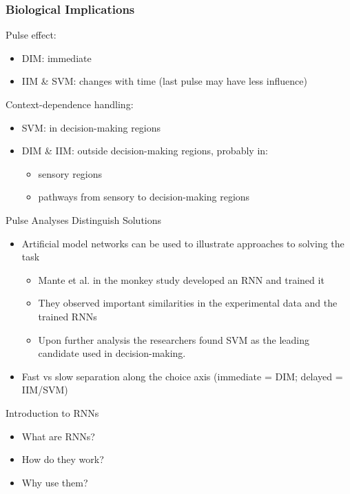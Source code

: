 \documentclass{beamer}
\begin{document}
\begin{frame}
\frametitle{Biological Implications}
Pulse effect:
\begin{itemize}
	\item DIM: immediate
	\item IIM \& SVM: changes with time (last pulse may have less influence)
\end{itemize}

Context-dependence handling:
\begin{itemize}
	\item SVM: in decision-making regions
	\item DIM \& IIM: outside decision-making regions, probably in:
		\begin{itemize}
			\item sensory regions
			\item pathways from sensory to decision-making regions
		\end{itemize} 
\end{itemize}
\end{frame}

\begin{frame}{Pulse Analyses Distinguish Solutions}
    \begin{itemize}
        \item Artificial model networks can be used to illustrate approaches to solving the task
        \begin{itemize}
            \item Mante et al. in the monkey study developed an RNN and trained it
            \item They observed important similarities in the experimental data and the trained RNNs
            \item Upon further analysis the researchers found SVM as the leading candidate used in decision-making.
        \end{itemize}
        \item Fast vs slow separation along the choice axis (immediate = DIM; delayed = IIM/SVM)
    \end{itemize}
\end{frame}

\begin{frame}{Introduction to RNNs}

\begin{itemize}
    \item What are RNNs?
    \item How do they work?
    \item Why use them?
\end{itemize}
    
\end{frame}
\end{document}
